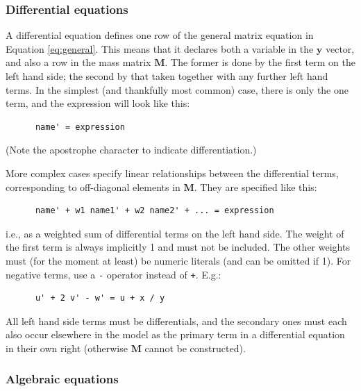 \documentclass[a4paper,11pt]{article}
\newcommand{\vv}[1]{\mathbf{#1}}
\begin{document}
\subsubsection{Differential equations}\label{diffs}

A differential equation defines one row of the general matrix equation in Equation \ref{eq:general}. This means that it declares both a variable in the $\vv{y}$ vector, and also a row in the mass matrix $\vv{M}$. The former is done by the first term on the left hand side; the second by that taken together with any further left hand terms. In the simplest (and thankfully most common) case, there is only the one term, and the expression will look like this:
\begin{verbatim}
      name' = expression
\end{verbatim}
(Note the apostrophe character to indicate differentiation.)

More complex cases specify linear relationships between the differential terms, corresponding to off-diagonal elements in $\vv{M}$. They are specified like this:
\begin{verbatim}
      name' + w1 name1' + w2 name2' + ... = expression
\end{verbatim}
i.e., as a weighted sum of differential terms on the left hand side. The weight of the first term is always implicitly 1 and must not be included. The other weights must (for the moment at least) be numeric literals (and can be omitted if 1). For negative terms, use a \texttt{-} operator instead of \texttt{+}. E.g.:
\begin{verbatim}
      u' + 2 v' - w' = u + x / y
\end{verbatim}
All left hand side terms must be differentials, and the secondary ones must each also occur elsewhere in the model as the primary term in a differential equation in their own right (otherwise $\vv{M}$ cannot be constructed).

\subsubsection{Algebraic equations}\label{diffs}
\end{document}
